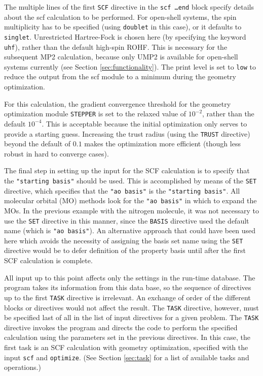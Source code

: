 The multiple lines of the first {\tt SCF} directive in the {\tt scf
  \ldots end} block specify details about the scf calculation to be
performed.  For open-shell systems, the spin multiplicity has to be
specified (using {\tt doublet} in this case), or it defaults to {\tt
  singlet}.  Unrestricted Hartree-Fock is chosen here (by specifying
the keyword {\tt uhf}), rather than the default high-spin ROHF.  This
is necessary for the subsequent MP2 calculation, because only UMP2 is
available for open-shell systems currently (see Section
\ref{sec:functionality}).  The print level is set to {\tt low} to
reduce the output from the scf module to a minimum during the geometry
optimization.

For this calculation, the gradient convergence threshold for the
geometry optimization module {\tt STEPPER} is set to the
relaxed value of $10^{-2}$, rather than the default $10^{-4}$.  This is
acceptable because the initial optimization only serves to provide a
starting guess.  Increasing the trust radius (using the \verb+TRUST+
directive) beyond the default of $0.1$ makes the optimization more
efficient (though less robust in hard to converge cases).

The final step in setting up the input for the SCF calculation is to
specify that the \verb+"starting basis"+ should be used.  This is
accomplished by means of the \verb+SET+ directive, which specifies that 
the \verb+"ao basis"+ is the \verb+"starting basis"+.  All molecular
orbital (MO) methods look for the \verb+"ao basis"+ in which to expand the
MOs.    In the previous example with the nitrogen molecule, it was not 
necessary to use the \verb+SET+ directive in this manner, since the 
\verb+BASIS+ directive used the default name (which is \verb+"ao basis"+).
An alternative approach that could have been used here which avoids the 
necessity of assigning the basis set name using the
\verb+SET+ directive would be to defer definition of the property basis
until after the first SCF calculation is complete. 

All input up to this point affects only the settings in the run-time
database.  The program takes its information from this data base, so
the sequence of directives up to the first \verb+TASK+ directive is
irrelevant.  An exchange of order of the different blocks or
directives would not affect the result.  The {\tt TASK} directive,
however, must be specified last of all in the list of input directives
for a given problem.  The {\tt TASK} directive invokes the program and
directs the code to perform the specified calculation using the
parameters set in the previous directives. In this case, the first
task is an SCF calculation with geometry optimization, specified with
the input {\tt scf} and {\tt optimize}.  (See Section \ref{sec:task}
for a list of available tasks and operations.)

